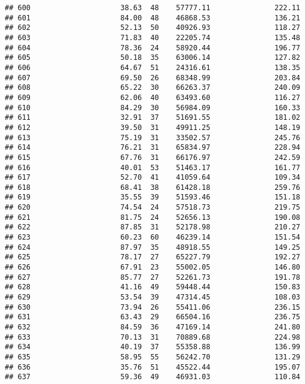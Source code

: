 \documentclass[
]{article}
\begin{document}
\begin{verbatim}
## 600                     38.63  48    57777.11               222.11
## 601                     84.00  48    46868.53               136.21
## 602                     52.13  50    40926.93               118.27
## 603                     71.83  40    22205.74               135.48
## 604                     78.36  24    58920.44               196.77
## 605                     50.18  35    63006.14               127.82
## 606                     64.67  51    24316.61               138.35
## 607                     69.50  26    68348.99               203.84
## 608                     65.22  30    66263.37               240.09
## 609                     62.06  40    63493.60               116.27
## 610                     84.29  30    56984.09               160.33
## 611                     32.91  37    51691.55               181.02
## 612                     39.50  31    49911.25               148.19
## 613                     75.19  31    33502.57               245.76
## 614                     76.21  31    65834.97               228.94
## 615                     67.76  31    66176.97               242.59
## 616                     40.01  53    51463.17               161.77
## 617                     52.70  41    41059.64               109.34
## 618                     68.41  38    61428.18               259.76
## 619                     35.55  39    51593.46               151.18
## 620                     74.54  24    57518.73               219.75
## 621                     81.75  24    52656.13               190.08
## 622                     87.85  31    52178.98               210.27
## 623                     60.23  60    46239.14               151.54
## 624                     87.97  35    48918.55               149.25
## 625                     78.17  27    65227.79               192.27
## 626                     67.91  23    55002.05               146.80
## 627                     85.77  27    52261.73               191.78
## 628                     41.16  49    59448.44               150.83
## 629                     53.54  39    47314.45               108.03
## 630                     73.94  26    55411.06               236.15
## 631                     63.43  29    66504.16               236.75
## 632                     84.59  36    47169.14               241.80
## 633                     70.13  31    70889.68               224.98
## 634                     40.19  37    55358.88               136.99
## 635                     58.95  55    56242.70               131.29
## 636                     35.76  51    45522.44               195.07
## 637                     59.36  49    46931.03               110.84

\end{verbatim}
\end{document}
